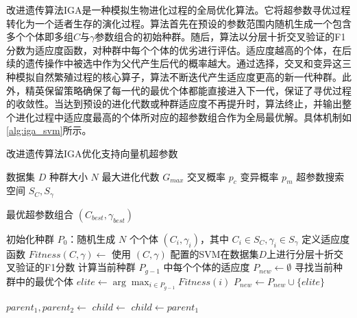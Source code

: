 改进遗传算法IGA是一种模拟生物进化过程的全局优化算法。它将超参数寻优过程转化为一个适者生存的演化过程。算法首先在预设的参数范围内随机生成一个包含多个个体即多组$C$与$\gamma$参数组合的初始种群。随后，算法以分层十折交叉验证的F1分数为适应度函数，对种群中每个个体的优劣进行评估。适应度越高的个体，在后续的遗传操作中被选中作为父代产生后代的概率越大。通过选择，交叉和变异这三种模拟自然繁殖过程的核心算子，算法不断迭代产生适应度更高的新一代种群。此外，精英保留策略确保了每一代的最优个体都能直接进入下一代，保证了寻优过程的收敛性。当达到预设的进化代数或种群适应度不再提升时，算法终止，并输出整个进化过程中适应度最高的个体所对应的超参数组合作为全局最优解。具体机制如\cref{alg:iga_svm}所示。

\begin{algorithm}[H]
    \caption{改进遗传算法IGA优化支持向量机超参数}
    \label{alg:iga_svm}
    \begin{algorithmic}[1]
        \Require
        \Statex 数据集 $D$
        \Statex 种群大小 $N$
        \Statex 最大进化代数 $G_{max}$
        \Statex 交叉概率 $p_c$
        \Statex 变异概率 $p_m$
        \Statex 超参数搜索空间 $S_C, S_{\gamma}$
        
        \Ensure
        \Statex 最优超参数组合 $(C_{best}, \gamma_{best})$

            \State 初始化种群 $P_0$：随机生成 $N$ 个个体 $(C_i, \gamma_i)$，其中 $C_i \in S_C, \gamma_i \in S_{\gamma}$
            \State 定义适应度函数 $Fitness(C, \gamma) \leftarrow$ 使用 $(C, \gamma)$ 配置的SVM在数据集$D$上进行分层十折交叉验证的F1分数
                \State 计算当前种群 $P_{g-1}$ 中每个个体的适应度
                \State $P_{new} \leftarrow \emptyset$ 
                \State 寻找当前种群中的最优个体 $elite \leftarrow \arg\max_{i \in P_{g-1}} Fitness(i)$
                \State $P_{new} \leftarrow P_{new} \cup \{elite\}$ 
                
                    \State {}
                    \State $parent_1, parent_2 \leftarrow$  
                        \State $child \leftarrow$  
                    \Else
                        \State $child \leftarrow parent_1$ 
                    \EndIf
                    

\end{algorithmic}
\end{algorithm}
